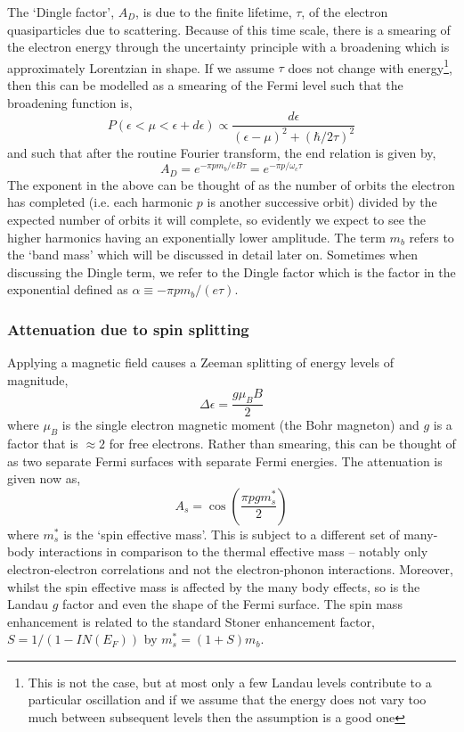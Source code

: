 The `Dingle factor', $A_D$, is due to the finite lifetime, $\tau$, of the electron quasiparticles due to scattering. Because of this time scale, there is a smearing of the electron energy through the uncertainty principle with a broadening which is approximately Lorentzian in shape. If we assume $\tau$ does not change with energy\footnote{This is not the case, but at most only a few Landau levels contribute to a particular oscillation and if we assume that the energy does not vary too much between subsequent levels then the assumption is a good one}, then this can be modelled as a smearing of the Fermi level such that the broadening function is,
\begin{equation}
  P(\epsilon < \mu < \epsilon + d\epsilon) \propto \frac{d\epsilon}{(\epsilon - \mu)^2 + (\hbar/2\tau)^2}
\end{equation}
and such that after the routine Fourier transform, the end relation is given by,
\begin{equation}
  A_D = e^{-\pi p m_b/e B\tau} = e^{-\pi p/\omega_c\tau} 
\label{Eqn:Theo:DingleTerm}
\end{equation}
The exponent in the above can be thought of as the number of orbits the electron has completed (i.e. each harmonic $p$ is another successive orbit) divided by the expected number of orbits it will complete, so evidently we expect to see the higher harmonics having an exponentially lower amplitude. The term $m_b$ refers to the `band mass' which will be discussed in detail later on. Sometimes when discussing the Dingle term, we refer to the Dingle factor which is the factor in the exponential defined as $\alpha \equiv -\pi p m_b/(e \tau)$.

\subsubsection{Attenuation due to spin splitting}

Applying a magnetic field causes a Zeeman splitting of energy levels of magnitude,
\begin{equation}
  \Delta\epsilon = \frac{g \mu_B B}{2}
\end{equation}
where $\mu_B$ is the single electron magnetic moment (the Bohr magneton) and $g$ is a factor that is $\approx2$ for free electrons. Rather than smearing, this can be thought of as two separate Fermi surfaces with separate Fermi energies. The attenuation is given now as,
\begin{equation}
  A_s = \cos\left(\frac{\pi p g m^*_s}{2}\right)
\end{equation}
where $m^*_s$ is the `spin effective mass'. This is subject to a different set of many-body interactions in comparison to the thermal effective mass -- notably only electron-electron correlations and not the electron-phonon interactions. Moreover, whilst the spin effective mass is affected by the many body effects, so is the Landau $g$ factor and even the shape of the Fermi surface. The spin mass enhancement is related to the standard Stoner enhancement factor, $S = 1/(1 - IN(E_F))$ by $m^*_s = (1 + S)m_b$.


